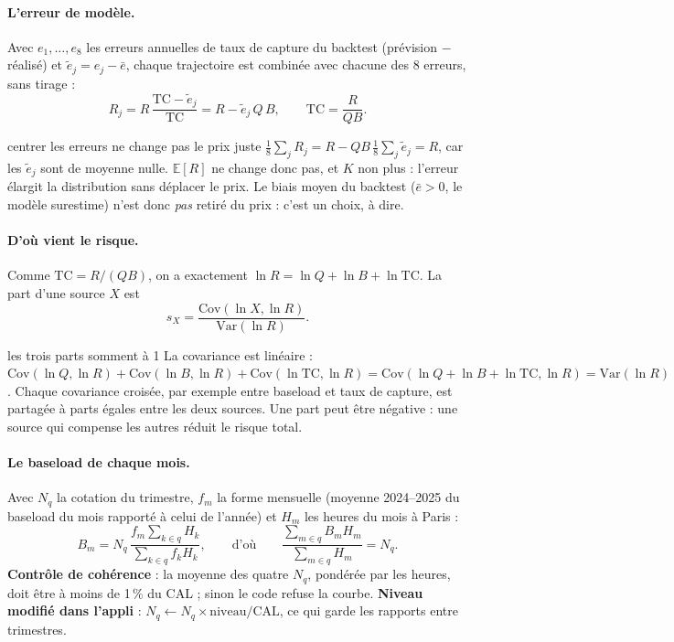 \documentclass[11pt,a4paper]{article}
\newcommand{\TC}{\mathrm{TC}}
\newcommand{\Cov}{\mathrm{Cov}}
\begin{document}
\paragraph{L'erreur de modèle.} Avec $e_1, \dots, e_8$ les erreurs annuelles de taux de capture du backtest (prévision $-$ réalisé) et $\tilde e_j = e_j - \bar e$, chaque trajectoire est combinée avec chacune des 8 erreurs, sans tirage :
\[
R_j = R\,\frac{\TC - \tilde e_j}{\TC} = R - \tilde e_j\,Q\,B,
\qquad \TC = \frac{R}{QB}.
\]

\begin{demo}{centrer les erreurs ne change pas le prix juste}
$\frac18\sum_j R_j = R - QB\,\frac18\sum_j \tilde e_j = R$, car les $\tilde e_j$ sont de moyenne nulle. $\mathbb E[R]$ ne change donc pas, et $K$ non plus : l'erreur élargit la distribution sans déplacer le prix. Le biais moyen du backtest ($\bar e > 0$, le modèle surestime) n'est donc \emph{pas} retiré du prix : c'est un choix, à dire.
\end{demo}

\paragraph{D'où vient le risque.} Comme $\TC = R/(QB)$, on a exactement $\ln R = \ln Q + \ln B + \ln \TC$. La part d'une source $X$ est
\[
s_X = \frac{\Cov(\ln X, \ln R)}{\mathrm{Var}(\ln R)} .
\]

\begin{demo}{les trois parts somment à 1}
La covariance est linéaire : $\Cov(\ln Q, \ln R) + \Cov(\ln B, \ln R) + \Cov(\ln \TC, \ln R) = \Cov(\ln Q + \ln B + \ln \TC, \ln R) = \mathrm{Var}(\ln R)$. Chaque covariance croisée, par exemple entre baseload et taux de capture, est partagée à parts égales entre les deux sources. Une part peut être négative : une source qui compense les autres réduit le risque total.
\end{demo}

\paragraph{Le baseload de chaque mois.} Avec $N_q$ la cotation du trimestre, $f_m$ la forme mensuelle (moyenne 2024--2025 du baseload du mois rapporté à celui de l'année) et $H_m$ les heures du mois à Paris :
\[
B_m = N_q\, \frac{f_m \sum_{k \in q} H_k}{\sum_{k \in q} f_k H_k},
\qquad\text{d'où}\qquad
\frac{\sum_{m \in q} B_m H_m}{\sum_{m \in q} H_m} = N_q .
\]
\textbf{Contrôle de cohérence} : la moyenne des quatre $N_q$, pondérée par les heures, doit être à moins de 1\,\% du CAL ; sinon le code refuse la courbe. \textbf{Niveau modifié dans l'appli} : $N_q \leftarrow N_q \times \text{niveau}/\text{CAL}$, ce qui garde les rapports entre trimestres.
\end{document}
